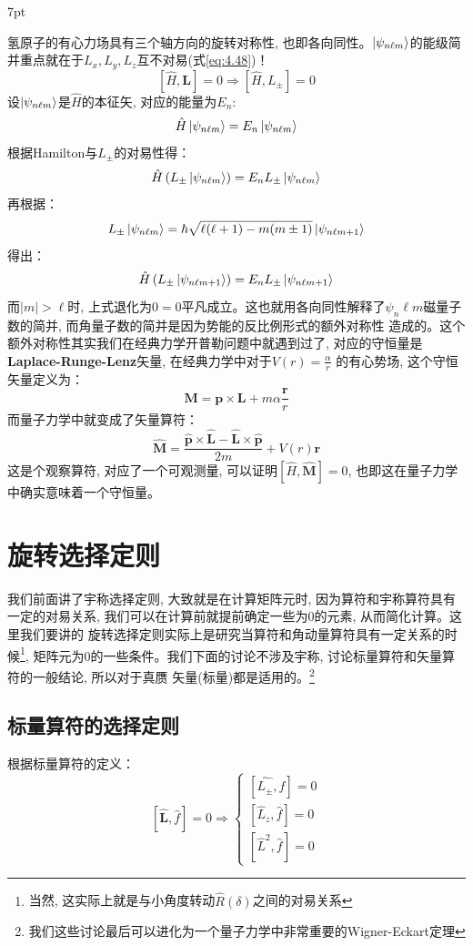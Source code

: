 \documentclass[a4paper,zihao=-4,linespread=1]{ctexrep}
\newenvironment{thinknote}{%
\def\FrameCommand{%
\hspace{1pt}%
{\color{BurlyWood}\vrule width 2pt}%
{\color{formalshade}\vrule width 4pt}%
\colorbox{formalshade}%
}%
\MakeFramed{\advance\hsize-\width\FrameRestore}%
\noindent\hspace{-4.55pt}%
\begin{adjustwidth}{}{7pt}%
\vspace{2pt}\vspace{2pt}%
}
{%
\vspace{2pt}\end{adjustwidth}\endMakeFramed%
}
\begin{document}
    \begin{thinknote}
        氢原子的有心力场具有三个轴方向的旋转对称性, 也即各向同性。$\ket{\psi_{n\ell m}}$的能级简并重点就在于$L_x,L_y,L_z$互不对易(式\ref{eq:4.48})！
        \[\left[\hat{H},\mathbf{L}\right]=0\Rightarrow\left[\hat{H},L_\pm\right]=0\]
        设$\ket{\psi_{n\ell m}}$是$\hat{H}$的本征矢, 对应的能量为$E_n$:
        \[\hat{H}\ket{\psi_{n\ell m}}=E_n\ket{\psi_{n\ell m}}\]
        根据Hamilton与$L_\pm$的对易性得：
        \[\hat{H}\left(L_\pm\ket{\psi_{n\ell m}}\right)=E_n L_\pm\ket{\psi_{n\ell m}}\]
        再根据：
        \[L_\pm \ket{\psi_{n\ell m}}=\hbar\sqrt{\ell(\ell+1)-m(m\pm 1)}\ket{\psi_{n\ell m+1}}\]
        得出：
        \[\hat{H}\left(L_\pm\ket{\psi_{n\ell m+1}}\right)=E_n L_\pm\ket{\psi_{n\ell m+1}}\]
        而$|m|>\ell$时, 上式退化为$0=0$平凡成立。这也就用各向同性解释了$\psi_n\ell m$磁量子数的简并, 而角量子数的简并是因为势能的反比例形式的额外对称性
        造成的。这个额外对称性其实我们在经典力学开普勒问题中就遇到过了, 对应的守恒量是\textbf{Laplace-Runge-Lenz}矢量, 在经典力学中对于$V(r)=\frac{\alpha}{r}$
        的有心势场, 这个守恒矢量定义为：
        \[\mathbf{M}=\mathbf{p}\times\mathbf{L}+m\alpha\frac{\mathbf{r}}{r}\]
        而量子力学中就变成了矢量算符：
        \[\hat{\mathbf{M}}=\frac{\hat{\mathbf{p}}\times\hat{\mathbf{L}}-\hat{\mathbf{L}}\times\hat{\mathbf{p}}}{2m}+V(r)\mathbf{r}\]
        这是个观察算符, 对应了一个可观测量, 可以证明$\left[\hat{H},\hat{\mathbf{M}}\right]=0$, 也即这在量子力学中确实意味着一个守恒量。
    \end{thinknote}
    
    \section{旋转选择定则}
    我们前面讲了宇称选择定则, 大致就是在计算矩阵元时, 因为算符和宇称算符具有一定的对易关系, 我们可以在计算前就提前确定一些为0的元素, 从而简化计算。这里我们要讲的
    旋转选择定则实际上是研究当算符和角动量算符具有一定关系的时候\footnote{当然, 这实际上就是与小角度转动$\hat{R}(\delta)$之间的对易关系}, 矩阵元为0的一些条件。我们下面的讨论不涉及宇称, 讨论标量算符和矢量算符的一般结论, 所以对于真赝
    矢量(标量)都是适用的。\footnote{我们这些讨论最后可以进化为一个量子力学中非常重要的Wigner-Eckart定理}
    \subsection{标量算符的选择定则}
    根据标量算符的定义：
    \begin{equation}
        \left[\hat{\mathbf{L}},\hat{f}\right]=0\Rightarrow\begin{cases}
            \left[\hat{L_\pm},\hat{f}\right]=0\\
            \left[\hat{L}_z,\hat{f}\right]=0\\
            \left[\hat{L}^2,\hat{f}\right]=0
        \end{cases}
    \end{equation}
\end{document}
